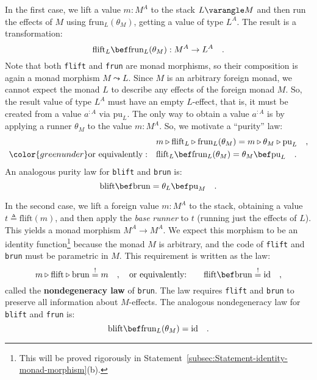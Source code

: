In the first case, we lift a value $m:M^{A}$ to the stack $L\varangle M$
and then run the effects of $M$ using $\text{frun}_{L}(\theta_{M})$,
getting a value of type $L^{A}$. The result is a transformation:
\[
\text{flift}_{L}\bef\text{frun}_{L}(\theta_{M}):M^{A}\rightarrow L^{A}\quad.
\]
Note that both \lstinline!flift! and \lstinline!frun! are monad
morphisms, so their composition is again a monad morphism $M\leadsto L$.
Since $M$ is an arbitrary foreign monad, we cannot expect the monad
$L$ to describe any effects of the foreign monad $M$. So, the result
value of type $L^{A}$ must have an empty $L$-effect, that is, it
must be created from a value $a^{:A}$ via $\text{pu}_{L}$. The only
way to obtain a value $a^{:A}$ is by applying a runner $\theta_{M}$
to the value $m:M^{A}$. So, we motivate a \textsf{``}purity\textsf{''} law:
\begin{align*}
 & m\triangleright\text{flift}_{L}\triangleright\text{frun}_{L}(\theta_{M})=m\triangleright\theta_{M}\triangleright\text{pu}_{L}\quad,\\
{\color{greenunder}\text{or equivalently}:}\quad & \text{flift}_{L}\bef\text{frun}_{L}(\theta_{M})=\theta_{M}\bef\text{pu}_{L}\quad.
\end{align*}
An analogous purity law
for \lstinline!blift! and \lstinline!brun! is:
\[
\text{blift}\bef\text{brun}=\theta_{L}\bef\text{pu}_{M}\quad.
\]

In the second case, we lift a foreign value $m:M^{A}$ to the stack,
obtaining a value $t\triangleq\text{flift}\left(m\right)$, and then
apply the \emph{base} \emph{runner} to $t$ (running just the effects
of $L$). This yields a monad morphism $M^{A}\rightarrow M^{A}$.
We expect this morphism to be an identity function\footnote{This will be proved rigorously in Statement~\ref{subsec:Statement-identity-monad-morphism}(b).}
because the monad $M$ is arbitrary, and the code of \lstinline!flift!
and \lstinline!brun! must be parametric in $M$. This requirement
is written as the law:
\[
m\triangleright\text{flift}\triangleright\text{brun}\overset{!}{=}m\quad,\quad\text{or equivalently:}\quad\quad\text{flift}\bef\text{brun}\overset{!}{=}\text{id}\quad,
\]
called the \textbf{nondegeneracy law}
of  \lstinline!brun!. The law requires \lstinline!flift! and \lstinline!brun!
to preserve all information about $M$-effects. The analogous nondegeneracy
law for \lstinline!blift! and \lstinline!frun! is:
\[
\text{blift}\bef\text{frun}_{L}(\theta_{M})=\text{id}\quad.
\]


